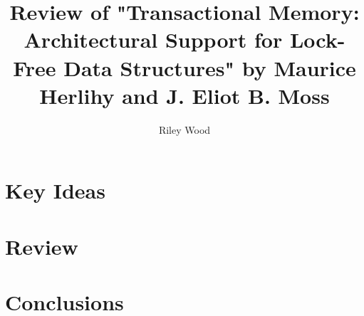 \documentclass{article}
\title{Review of "Transactional Memory: Architectural Support for Lock-Free Data Structures" by Maurice Herlihy and J. Eliot B. Moss}
\author{Riley Wood}
\begin{document}
\maketitle


\section*{Key Ideas}


\section*{Review}


\section*{Conclusions}





\end{document}
